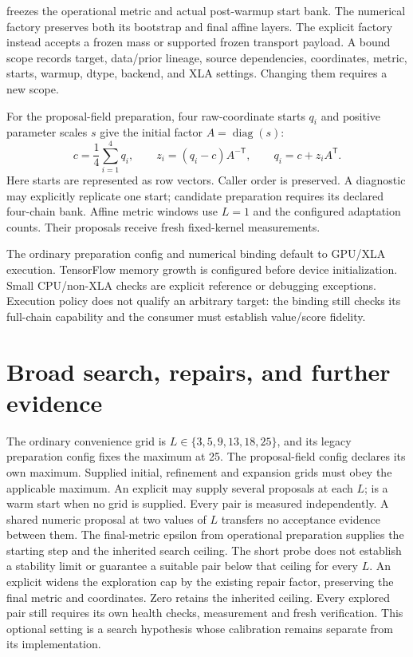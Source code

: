  freezes the operational metric
and actual post-warmup start bank. The numerical factory
 preserves both its
bootstrap and final affine layers. The explicit
 factory instead accepts a frozen mass
or supported frozen transport payload. A bound scope records target, data/prior
lineage, source dependencies, coordinates, metric, starts, warmup, dtype,
backend, and XLA settings. Changing them requires a new scope.

For the proposal-field preparation, four raw-coordinate starts $q_i$ and
positive parameter scales $s$ give the initial factor $A=\operatorname{diag}(s)$:
\begin{equation}
 c=\frac{1}{4}\sum_{i=1}^{4}q_i,
 \qquad z_i=(q_i-c)A^{-\mathsf T},
 \qquad q_i=c+z_iA^{\mathsf T}.
 \label{eq:bf-tensorflow-hmc-initial-bank}
\end{equation}
Here starts are represented as row vectors. Caller order is preserved.
A diagnostic may explicitly replicate one start; candidate preparation requires
its declared four-chain bank. Affine metric windows use $L=1$ and the configured
adaptation counts. Their proposals receive fresh fixed-kernel measurements.

The ordinary preparation config and numerical binding default to GPU/XLA
execution. TensorFlow memory growth is configured before device initialization.
Small CPU/non-XLA checks are explicit reference or debugging exceptions.
Execution policy does not qualify an arbitrary target: the binding still checks
its full-chain capability and the consumer must establish value/score fidelity.

\section{Broad search, repairs, and further evidence}
\label{sec:bf-fixed-transport-joint-tuning}
\label{sec:bf-fixed-transport-candidate-selection}

The ordinary convenience grid is $L\in\{3,5,9,13,18,25\}$, and its legacy
preparation config fixes the maximum at 25. The proposal-field config declares
its own maximum. Supplied initial, refinement and expansion grids must obey
the applicable maximum. An explicit  may supply several proposals
at each $L$;  is a warm start when no grid is supplied.
Every pair is measured independently. A shared numeric proposal at two values
of $L$ transfers no acceptance evidence between them. The final-metric epsilon
from operational preparation supplies the starting step and the inherited search
ceiling. The short probe does not establish a stability limit or guarantee a
suitable pair below that ceiling for every $L$. An explicit
 widens the exploration cap by
the existing repair factor, preserving the final metric and coordinates.
Zero retains the inherited ceiling. Every explored pair still requires its own
health checks, measurement and fresh verification. This optional setting is a
search hypothesis whose calibration remains separate from its implementation.


